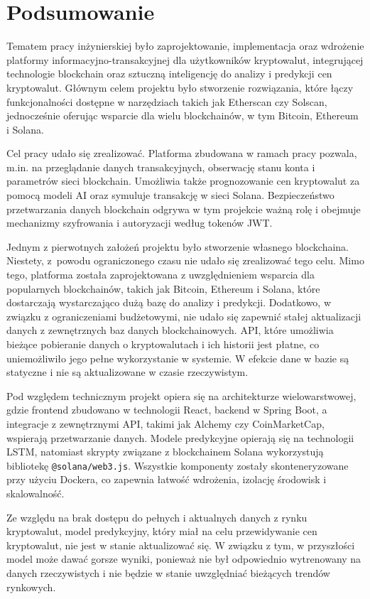\chapter{Podsumowanie}
Tematem pracy inżynierskiej było zaprojektowanie, implementacja oraz wdrożenie platformy informacyjno-transakcyjnej dla użytkowników kryptowalut, integrującej technologie blockchain oraz sztuczną inteligencję do analizy i predykcji cen kryptowalut. Głównym celem projektu było stworzenie rozwiązania, które łączy funkcjonalności dostępne w narzędziach takich jak Etherscan czy Solscan, jednocześnie oferując wsparcie dla wielu blockchainów, w tym Bitcoin, Ethereum i Solana. 

Cel pracy udało się zrealizować. Platforma zbudowana w ramach pracy pozwala, m.in. na przeglądanie danych transakcyjnych, obserwację stanu konta i parametrów sieci blockchain. Umożliwia także prognozowanie cen kryptowalut za pomocą modeli AI oraz symuluje transakcję w sieci Solana. Bezpieczeństwo przetwarzania danych blockchain odgrywa w tym projekcie ważną rolę i obejmuje mechanizmy szyfrowania i autoryzacji według tokenów JWT.

Jednym z pierwotnych założeń projektu było stworzenie własnego blockchaina. Niestety, z~powodu ograniczonego czasu nie udało się zrealizować tego celu. Mimo tego, platforma została zaprojektowana z uwzględnieniem wsparcia dla popularnych blockchainów, takich jak Bitcoin, Ethereum i Solana, które dostarczają wystarczająco dużą bazę do analizy i predykcji. Dodatkowo, w związku z ograniczeniami budżetowymi, nie udało się zapewnić stałej aktualizacji danych z zewnętrznych baz danych blockchainowych. API, które umożliwia bieżące pobieranie danych o kryptowalutach i ich historii jest płatne, co uniemożliwiło jego pełne wykorzystanie w systemie. W efekcie dane w bazie są statyczne i nie są aktualizowane w czasie rzeczywistym.

Pod względem technicznym projekt opiera się na architekturze wielowarstwowej, gdzie frontend zbudowano w technologii React, backend w Spring Boot, a integracje z zewnętrznymi API, takimi jak Alchemy czy CoinMarketCap, wspierają przetwarzanie danych. Modele predykcyjne opierają się na technologii LSTM, natomiast skrypty związane z blockchainem Solana wykorzystują bibliotekę \texttt{@solana/web3.js}. Wszystkie komponenty zostały skonteneryzowane przy użyciu Dockera, co zapewnia łatwość wdrożenia, izolację środowisk i skalowalność. 

Ze względu na brak dostępu do pełnych i aktualnych danych z rynku kryptowalut, model predykcyjny, który miał na celu przewidywanie cen kryptowalut, nie jest w stanie aktualizować się. W związku z tym, w przyszłości model może dawać gorsze wyniki, ponieważ nie był odpowiednio wytrenowany na danych rzeczywistych i nie będzie w stanie uwzględniać bieżących trendów rynkowych.

